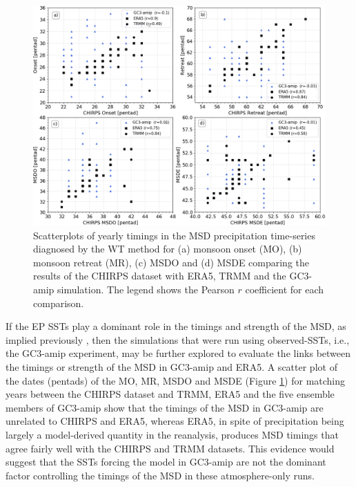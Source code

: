 \begin{figure}[t!]
\includegraphics[width=\linewidth]{figures/master_sst_scatter.png}
\caption[Scatter plot of SST vs precipitation]{Scatterplots of yearly timings in the MSD precipitation time-series diagnosed by the WT method for (a) monsoon onset (MO), (b) monsoon retreat (MR), (c) MSDO and (d) MSDE comparing the results of the CHIRPS dataset with ERA5, TRMM and the GC3-amip simulation. The legend shows the Pearson $r$ coefficient for each comparison. }
\label{fig:amipsstscatter}
\end{figure}




If the EP SSTs play a dominant role in the timings and strength of the MSD, as implied previously \citep{magana1999,magana2005,herrera2015}, then the simulations that were run using observed-SSTs, i.e., the GC3-amip experiment, may be further explored to evaluate the links  between the timings or strength of the MSD in GC3-amip and ERA5. A scatter plot of the dates (pentads) of the MO, MR, MSDO and MSDE (Figure \ref{fig:amipsstscatter}) for matching years between the CHIRPS dataset and TRMM, ERA5 and the five ensemble members of GC3-amip show that the timings of the MSD in GC3-amip are unrelated to CHIRPS and ERA5, whereas ERA5, in spite of precipitation being largely a model-derived quantity in the reanalysis, produces MSD timings that agree fairly well with the CHIRPS and TRMM datasets. 
This evidence would suggest that the SSTs forcing the model in GC3-amip are not the dominant factor controlling the timings of the MSD in these atmosphere-only runs.

